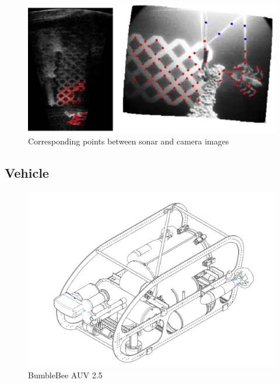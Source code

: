 \documentclass[a4paper]{IEEEtran}
\begin{document}
\begin{figure}[h!]
  \centering
  \includegraphics[scale=0.3]{sonarcam}
  \captionsetup{justification=centering}
  \caption{Corresponding points between sonar and camera images}
\end{figure}

\subsection{Vehicle}

\begin{figure}[h!]
  \centering
  \includegraphics[scale=0.2]{bbauv25}
  \captionsetup{justification=centering}
  \caption{BumbleBee AUV 2.5}
\end{figure}
\end{document}
